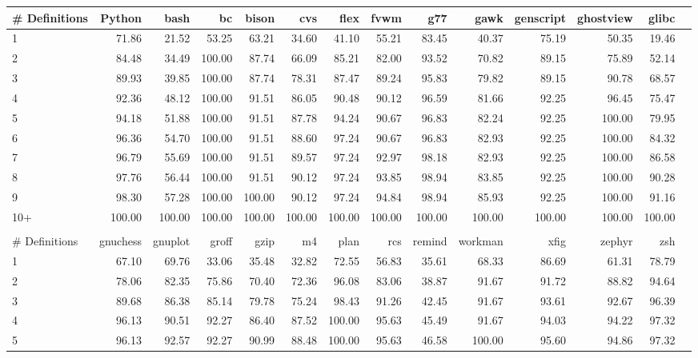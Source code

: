 \begin{tabular}{|l|r|r|r|r|r|r|r|r|r|r|r|r|r|}\hline
\# Definitions & Python & bash & bc & bison & cvs & flex & fvwm & g77 & gawk & genscript & ghostview & glibc\\\hline\hline
1 & 71.86 & 21.52 & 53.25 & 63.21 & 34.60 & 41.10 & 55.21 & 83.45 & 40.37 & 75.19 & 50.35 & 19.46\\\hline
2 & 84.48 & 34.49 & 100.00 & 87.74 & 66.09 & 85.21 & 82.00 & 93.52 & 70.82 & 89.15 & 75.89 & 52.14\\\hline
3 & 89.93 & 39.85 & 100.00 & 87.74 & 78.31 & 87.47 & 89.24 & 95.83 & 79.82 & 89.15 & 90.78 & 68.57\\\hline
4 & 92.36 & 48.12 & 100.00 & 91.51 & 86.05 & 90.48 & 90.12 & 96.59 & 81.66 & 92.25 & 96.45 & 75.47\\\hline
5 & 94.18 & 51.88 & 100.00 & 91.51 & 87.78 & 94.24 & 90.67 & 96.83 & 82.24 & 92.25 & 100.00 & 79.95\\\hline
6 & 96.36 & 54.70 & 100.00 & 91.51 & 88.60 & 97.24 & 90.67 & 96.83 & 82.93 & 92.25 & 100.00 & 84.32\\\hline
7 & 96.79 & 55.69 & 100.00 & 91.51 & 89.57 & 97.24 & 92.97 & 98.18 & 82.93 & 92.25 & 100.00 & 86.58\\\hline
8 & 97.76 & 56.44 & 100.00 & 91.51 & 90.12 & 97.24 & 93.85 & 98.94 & 83.85 & 92.25 & 100.00 & 90.28\\\hline
9 & 98.30 & 57.28 & 100.00 & 100.00 & 90.12 & 97.24 & 94.84 & 98.94 & 85.93 & 92.25 & 100.00 & 91.16\\\hline
10+ & 100.00 & 100.00 & 100.00 & 100.00 & 100.00 & 100.00 & 100.00 & 100.00 & 100.00 & 100.00 & 100.00 & 100.00\\\hline
\multicolumn{12}{c}{} \\
\hline
\# Definitions & gnuchess & gnuplot & groff & gzip & m4 & plan & rcs & remind & workman & xfig & zephyr & zsh\\\hline\hline
1 & 67.10 & 69.76 & 33.06 & 35.48 & 32.82 & 72.55 & 56.83 & 35.61 & 68.33 & 86.69 & 61.31 & 78.79\\\hline
2 & 78.06 & 82.35 & 75.86 & 70.40 & 72.36 & 96.08 & 83.06 & 38.87 & 91.67 & 91.72 & 88.82 & 94.64\\\hline
3 & 89.68 & 86.38 & 85.14 & 79.78 & 75.24 & 98.43 & 91.26 & 42.45 & 91.67 & 93.61 & 92.67 & 96.39\\\hline
4 & 96.13 & 90.51 & 92.27 & 86.40 & 87.52 & 100.00 & 95.63 & 45.49 & 91.67 & 94.03 & 94.22 & 97.32\\\hline
5 & 96.13 & 92.57 & 92.27 & 90.99 & 88.48 & 100.00 & 95.63 & 46.58 & 100.00 & 95.60 & 94.86 & 97.32\\\hline

\end{tabular}
